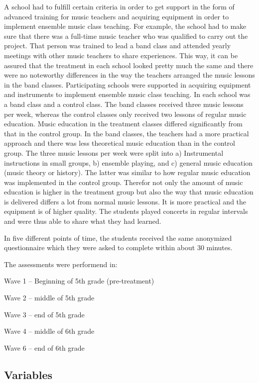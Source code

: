 \documentclass[a4, 12pt]{article}
\begin{document}
A school had to fulfill certain criteria in order to get support in the form of advanced training for music teachers and acquiring equipment in order to implement ensemble music class teaching. For example, the school had to make sure that there was a full-time music teacher who was qualified to carry out the project. That person was trained to lead a band class and attended yearly meetings with other music teachers to share experiences. This way, it can be assured that the treatment in each school looked pretty much the same and there were no noteworthy differences in the way the teachers arranged the music lessons in the band classes. Participating schools were supported in acquiring equipment and instruments to implement ensemble music class teaching. In each school was a band class and a control class. The band classes received three music lessons per week, whereas the control classes only received two lessons of regular music education. Music education in the treatment classes differed significantly from that in the control group. In the band classes, the teachers had a more practical approach and there was less theoretical music education than in the control group. The three music lessons per week were split into a) Instrumental instructions in small groups, b) ensemble playing, and c) general music education (music theory or history). The latter was similar to how regular music education was implemented in the control group. Therefor not only the amount of music education is higher in the treatment group but also the way that music education is delivered differs a lot from normal music lessons. It is more practical and the equipment is of higher quality. The students played concerts in regular intervals and were thus able to share what they had learned.

In five different points of time, the students received the same anonymized questionnaire which they were asked to complete within about 30 minutes.

The assessments were performend in:

Wave 1 -- Beginning of 5th grade (pre-treatment)

Wave 2 -- middle of 5th grade

Wave 3 -- end of 5th grade

Wave 4 -- middle of 6th grade

Wave 6 -- end of 6th grade

\hypertarget{variables}{%
\subsection{Variables}\label{variables}}
\end{document}
